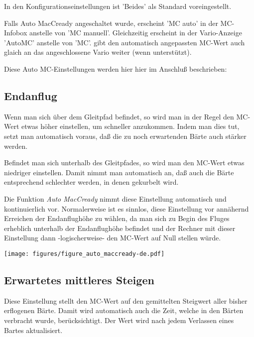 In den Konfigurationseinstellungen ist  'Beides' als Standard voreingestellt.

Falls Auto MacCready angeschaltet wurde, erscheint 'MC auto' in der MC-Infobox
anstelle von 'MC manuell'. Gleichzeitig erscheint in der Vario-Anzeige 'AutoMC' anstelle von 'MC'.
\xc gibt den automatisch angepassten MC-Wert auch glaich an das angeschlossene 
Vario weiter (wenn unterstützt).

Diese Auto MC-Einstellungen werden hier hier im Anschluß beschrieben:

\subsection*{Endanflug}
Wenn man sich über dem Gleitpfad befindet, so wird man in der Regel den MC-Wert etwas höher einstellen,
um schneller anzukommen. Indem man dies tut, setzt man automatisch voraus, daß die zu noch erwartenden
Bärte auch stärker werden.

Befindet man sich unterhalb des Gleitpfades, so wird man den MC-Wert etwas niedriger einstellen.
Damit nimmt man automatisch an, daß auch die Bärte entsprechend schlechter werden, in denen gekurbelt wird.

Die Funktion \textsl{Auto MacCready} nimmt diese Einstellung automatisch und kontinuierlich vor.
Normalerweise ist es sinnlos, diese Einstellung vor annähernd Erreichen der Endanflughöhe  zu wählen, da man sich
zu Begin des Fluges erheblich unterhalb der Endanflughöhe befindet und der Rechner mit dieser Einstellung dann
-logischerweise- den MC-Wert auf Null stellen würde.


\begin{maxipage}
\begin{center}
\texttt{[image: figures/figure\_auto\_maccready-de.pdf]}
\end{center}
\end{maxipage}

\subsection*{Erwartetes mittleres Steigen}

Diese Einstellung stellt den MC-Wert auf den gemittelten Steigwert aller bisher erflogenen Bärte.
Damit wird automatisch auch die Zeit, welche in den Bärten verbracht wurde, berücksichtigt.
Der Wert wird nach jedem Verlassen eines Bartes aktualisiert.

